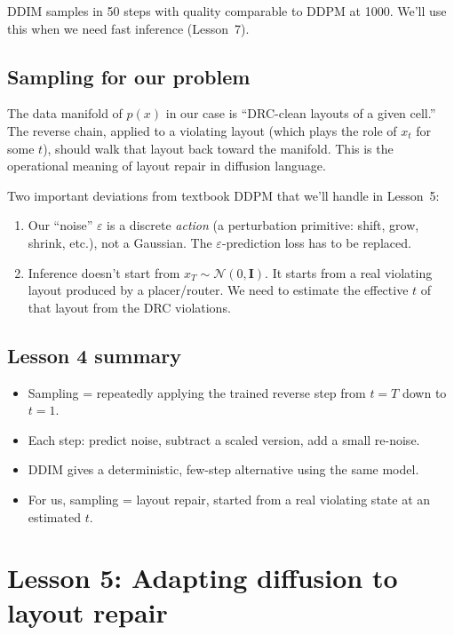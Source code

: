 \documentclass[11pt,a4paper]{article}
\newcommand{\N}{\mathcal{N}}
\newcommand{\eps}{\varepsilon}
\begin{document}
DDIM samples in 50 steps with quality comparable to DDPM at 1000.
We'll use this when we need fast inference (Lesson~7).

\subsection{Sampling for our problem}

The data manifold of $p(x)$ in our case is ``DRC-clean layouts of a
given cell.'' The reverse chain, applied to a violating layout (which
plays the role of $x_t$ for some $t$), should walk that layout back
toward the manifold. This is the operational meaning of layout repair
in diffusion language.

Two important deviations from textbook DDPM that we'll handle in
Lesson~5:
\begin{enumerate}[leftmargin=*]
\item Our ``noise'' $\eps$ is a discrete \emph{action} (a perturbation
  primitive: shift, grow, shrink, etc.), not a Gaussian. The
  $\eps$-prediction loss has to be replaced.
\item Inference doesn't start from $x_T \sim \N(0, \mathbf{I})$. It starts
  from a real violating layout produced by a placer/router. We need to
  estimate the effective $t$ of that layout from the DRC violations.
\end{enumerate}

\subsection{Lesson 4 summary}

\begin{itemize}[leftmargin=*]
\item Sampling = repeatedly applying the trained reverse step from $t = T$ down to $t = 1$.
\item Each step: predict noise, subtract a scaled version, add a small re-noise.
\item DDIM gives a deterministic, few-step alternative using the same model.
\item For us, sampling = layout repair, started from a real violating state at an estimated $t$.
\end{itemize}

\section{Lesson 5: Adapting diffusion to layout repair}
\end{document}

